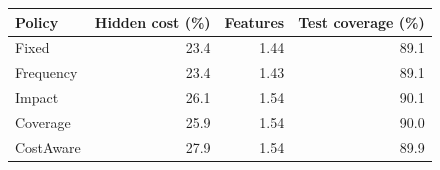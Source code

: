 \begin{kbtable}
\caption{Cost-constrained hiding on 648 Original programs. Heterogeneous controlled costs, selection coverage requirement $q=0.8$; means weight the six datasets equally and include empty-subset fallbacks. Hidden cost is a fraction of total active-feature cost.}
\label{tab:contextual-cost}
\centering\small
\begin{tabular}{lrrr}
\toprule
Policy & Hidden cost (\%) & Features & Test coverage (\%)\\
\midrule
Fixed & 23.4 & 1.44 & 89.1\\
Frequency & 23.4 & 1.43 & 89.1\\
Impact & 26.1 & 1.54 & 90.1\\
Coverage & 25.9 & 1.54 & 90.0\\
CostAware & 27.9 & 1.54 & 89.9\\
\bottomrule
\end{tabular}
\end{kbtable}

